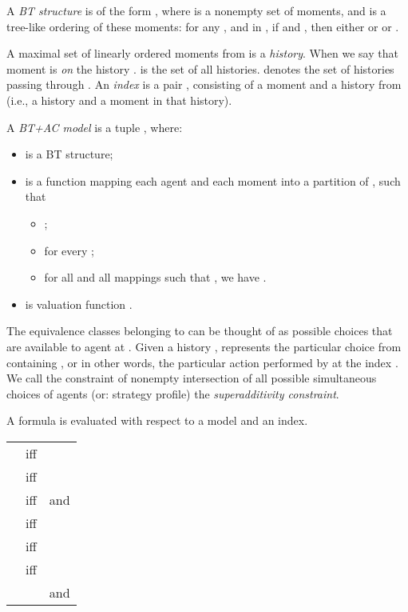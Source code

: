 \documentclass{article}
\begin{document}
A \emph{BT structure} is of the form , where
 is a nonempty set of moments, and
 is a tree-like ordering of these moments: for any
,  and  in , if  and ,
then either  or  or .

A maximal set of linearly ordered moments from  is a \emph{history}.
When  we say that moment  is \emph{on} the history .
 is the set of all histories.
 denotes the set of histories passing through .
An \emph{index} is a pair , consisting of a moment  and a
history  from  (i.e., a history and a moment in that history).

A \emph{BT+AC model} is a tuple , where:
\begin{itemize}
\item  is a BT structure;

\item 
is a function mapping each agent and each moment  into a partition of ,
such that
    \begin{itemize}
    \item ;
    \item  for every ;
    \item for all  and all mappings 
          such that ,
          we have .
    \end{itemize}

\item  is valuation function .
\end{itemize}
The equivalence classes belonging to  can be thought of as possible choices
that are available to agent  at .
Given a history ,  represents the particular choice
from  containing , or in other words, the particular action
performed by  at the index .
We call the constraint of nonempty intersection of all possible simultaneous choices of agents
(or: strategy profile) the \emph{superadditivity constraint}.

A formula is evaluated with respect to a model and an index.\\

\begin{tabular}{lcl}
 & iff  & \\
 & iff & \\
 & iff &  and
                                                  \\
 & iff & \\
 & iff & \\

 & iff & \\
                      && and 
\end{tabular}\\
\end{document}
